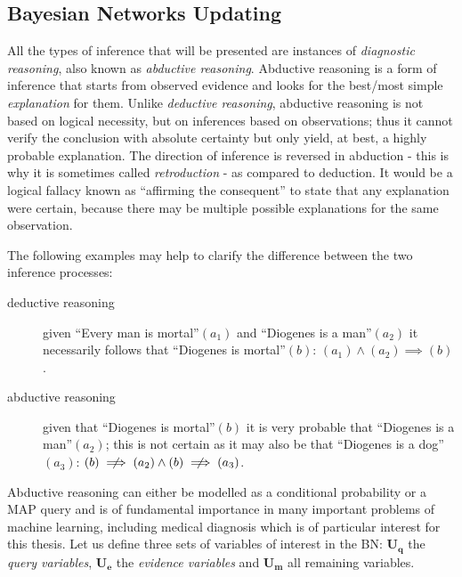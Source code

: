 \subsection{Bayesian Networks Updating} \label{subsec:bnupdating}
All the types of inference that will be presented are instances of \textit{diagnostic reasoning}, also known as \textit{abductive reasoning}. 
Abductive reasoning is a form of inference that starts from observed evidence and looks for the best/most simple \textit{explanation} for them.
Unlike \textit{deductive reasoning}, abductive reasoning is not based on logical necessity, but on inferences based on observations; thus it cannot verify the conclusion with absolute certainty but only yield, at best, a highly probable explanation.
The direction of inference is reversed in abduction - this is why it is sometimes called \textit{retroduction} - as compared to deduction.
It would be a logical fallacy known as \enquote{affirming the consequent} to state that any explanation were certain, because there may be multiple possible explanations for the same observation.

The following examples may help to clarify the difference between the two inference processes:
\begin{description}
	\item[deductive reasoning] given \enquote{Every man is mortal}$(a_1)$ and \enquote{Diogenes is a man}$(a_2)$ it necessarily follows that \enquote{Diogenes is mortal}$(b)$: $(a_1) \wedge (a_2) \implies (b) $.
	\item[abductive reasoning] given that \enquote{Diogenes is mortal}$(b)$ it is very probable that \enquote{Diogenes is a man}$(a_2)$; this is not certain as it may also be that \enquote{Diogenes is a dog}$(a_3)$: $(b) \centernot\implies (a_2) \wedge (b) \centernot\implies (a_3) $.
\end{description}

Abductive reasoning can either be modelled as a conditional probability or a MAP query and is of fundamental importance in many important problems of machine learning, including medical diagnosis which is of particular interest for this thesis.
Let us define three sets of variables of interest in the BN: $\boldsymbol{U_q}$ the \textit{query variables}, $\boldsymbol{U_e}$ the \textit{evidence variables} and $\boldsymbol{U_m}$ all remaining variables.

